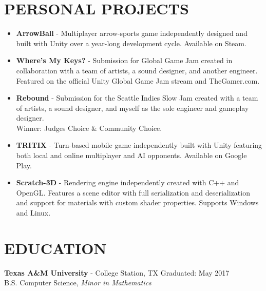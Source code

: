 \documentclass[resmargin,10pt]{res} %
\begin{document}
\begin{resume}
\section{PERSONAL PROJECTS}
				\begin{itemize}       
				\item \textbf{ArrowBall} - Multiplayer arrow-sports game independently designed and built with Unity over a year-long development cycle. Available on Steam.
				                	\item \textbf{Where's My Keys?} - Submission for Global Game Jam created in collaboration with a team of artists, a sound designer, and another engineer. Featured on the official Unity Global Game Jam stream and TheGamer.com.
				                	                	\item \textbf{Rebound} - Submission for the Seattle Indies Slow Jam created with a team of artists, a sound designer, and myself as the sole engineer and gameplay designer. \\ Winner: Judges Choice \& Community Choice.
                	\item \textbf{TRITIX} - Turn-based mobile game independently built with Unity featuring both local and online multiplayer and AI opponents. Available on Google Play.
                	\item \textbf{Scratch-3D} - Rendering engine independently created with C++ and OpenGL. Features a scene editor with full serialization and deserialization and support for materials with custom shader properties. Supports Windows and Linux.
                \end{itemize}
                
\section{EDUCATION}
{\bf Texas A\&M University} - College Station, TX \hfill
Graduated: May 2017 \\
B.S. Computer Science,
\textit{Minor in Mathematics}
\end{resume} 
\end{document}
